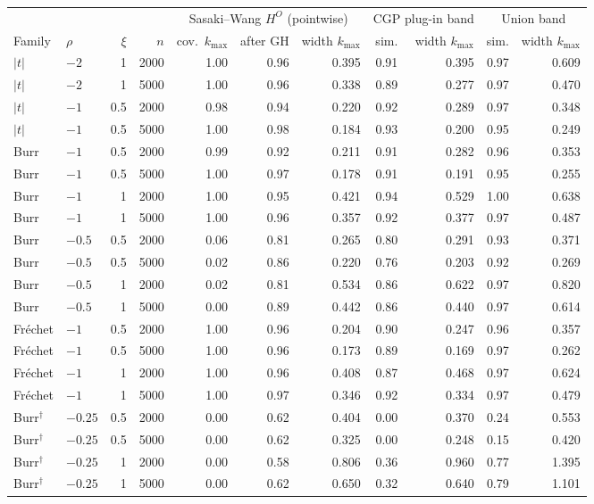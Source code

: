 \begin{tabular}{llrrrrrrrrr}
\toprule
 & & & & \multicolumn{3}{c}{Sasaki--Wang $H^{O}$ (pointwise)} & \multicolumn{2}{c}{CGP plug-in band} & \multicolumn{2}{c}{Union band}\\
\cmidrule(lr){5-7}\cmidrule(lr){8-9}\cmidrule(lr){10-11}
Family & $\rho$ & $\xi$ & $n$ & cov.\ $k_{\max}$ & after GH & width $k_{\max}$ & sim. & width $k_{\max}$ & sim. & width $k_{\max}$\\
\midrule
$|t|$ & $-2$ & 1 & 2000 & 1.00 & 0.96 & 0.395 & 0.91 & 0.395 & 0.97 & 0.609\\
$|t|$ & $-2$ & 1 & 5000 & 1.00 & 0.96 & 0.338 & 0.89 & 0.277 & 0.97 & 0.470\\
$|t|$ & $-1$ & 0.5 & 2000 & 0.98 & 0.94 & 0.220 & 0.92 & 0.289 & 0.97 & 0.348\\
$|t|$ & $-1$ & 0.5 & 5000 & 1.00 & 0.98 & 0.184 & 0.93 & 0.200 & 0.95 & 0.249\\
Burr & $-1$ & 0.5 & 2000 & 0.99 & 0.92 & 0.211 & 0.91 & 0.282 & 0.96 & 0.353\\
Burr & $-1$ & 0.5 & 5000 & 1.00 & 0.97 & 0.178 & 0.91 & 0.191 & 0.95 & 0.255\\
Burr & $-1$ & 1 & 2000 & 1.00 & 0.95 & 0.421 & 0.94 & 0.529 & 1.00 & 0.638\\
Burr & $-1$ & 1 & 5000 & 1.00 & 0.96 & 0.357 & 0.92 & 0.377 & 0.97 & 0.487\\
Burr & $-0.5$ & 0.5 & 2000 & 0.06 & 0.81 & 0.265 & 0.80 & 0.291 & 0.93 & 0.371\\
Burr & $-0.5$ & 0.5 & 5000 & 0.02 & 0.86 & 0.220 & 0.76 & 0.203 & 0.92 & 0.269\\
Burr & $-0.5$ & 1 & 2000 & 0.02 & 0.81 & 0.534 & 0.86 & 0.622 & 0.97 & 0.820\\
Burr & $-0.5$ & 1 & 5000 & 0.00 & 0.89 & 0.442 & 0.86 & 0.440 & 0.97 & 0.614\\
Fr\'echet & $-1$ & 0.5 & 2000 & 1.00 & 0.96 & 0.204 & 0.90 & 0.247 & 0.96 & 0.357\\
Fr\'echet & $-1$ & 0.5 & 5000 & 1.00 & 0.96 & 0.173 & 0.89 & 0.169 & 0.97 & 0.262\\
Fr\'echet & $-1$ & 1 & 2000 & 1.00 & 0.96 & 0.408 & 0.87 & 0.468 & 0.97 & 0.624\\
Fr\'echet & $-1$ & 1 & 5000 & 1.00 & 0.97 & 0.346 & 0.92 & 0.334 & 0.97 & 0.479\\
Burr$^{\dagger}$ & $-0.25$ & 0.5 & 2000 & 0.00 & 0.62 & 0.404 & 0.00 & 0.370 & 0.24 & 0.553\\
Burr$^{\dagger}$ & $-0.25$ & 0.5 & 5000 & 0.00 & 0.62 & 0.325 & 0.00 & 0.248 & 0.15 & 0.420\\
Burr$^{\dagger}$ & $-0.25$ & 1 & 2000 & 0.00 & 0.58 & 0.806 & 0.36 & 0.960 & 0.77 & 1.395\\
Burr$^{\dagger}$ & $-0.25$ & 1 & 5000 & 0.00 & 0.62 & 0.650 & 0.32 & 0.640 & 0.79 & 1.101\\
\bottomrule
\end{tabular}
